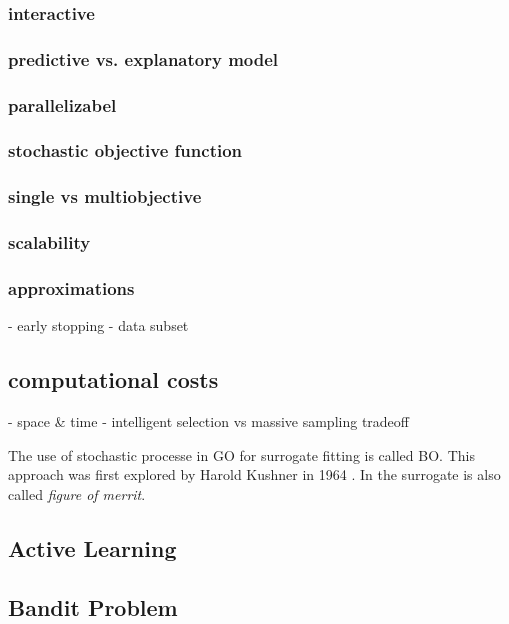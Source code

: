 \documentclass[english]{article}
\begin{document}
\subsubsection*{interactive}

\subsubsection*{predictive vs. explanatory model}

\subsubsection*{parallelizabel}

\subsubsection*{stochastic objective function}

\subsubsection*{single vs multiobjective}

\subsubsection*{scalability}

\subsubsection*{approximations}
 - early stopping
 - data subset

 \subsection{computational costs}
 - space \& time
 - intelligent selection vs massive sampling tradeoff


The use of stochastic processe in \ac{GO} for surrogate fitting is called \ac{BO}. This approach was first explored by Harold Kushner in 1964 \cite{kushner_new_1964}. In \cite{jones_efficient_1998} the surrogate is also called \textit{figure of merrit}.


\subsection{Active Learning}


\subsection{Bandit Problem}
\end{document}
